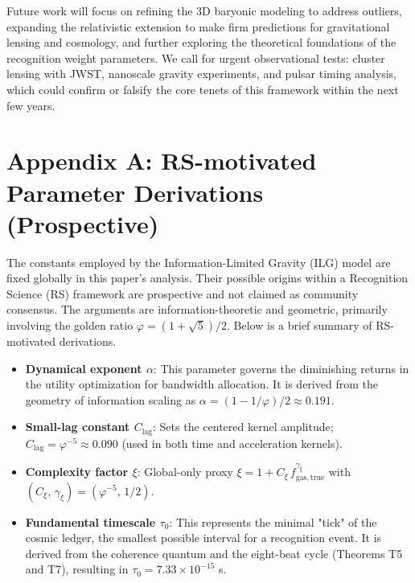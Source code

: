 \documentclass[12pt,a4paper]{article}
\begin{document}
Future work will focus on refining the 3D baryonic modeling to address outliers, expanding the relativistic extension to make firm predictions for gravitational lensing and cosmology, and further exploring the theoretical foundations of the recognition weight parameters. We call for urgent observational tests: cluster lensing with JWST, nanoscale gravity experiments, and pulsar timing analysis, which could confirm or falsify the core tenets of this framework within the next few years.

\appendix
\section*{Appendix A: RS-motivated Parameter Derivations (Prospective)}

The constants employed by the Information-Limited Gravity (ILG) model are fixed globally in this paper's analysis. Their possible origins within a Recognition Science (RS) framework are prospective and not claimed as community consensus. The arguments are information-theoretic and geometric, primarily involving the golden ratio $\varphi = (1+\sqrt{5})/2$. Below is a brief summary of RS-motivated derivations.

\begin{itemize}
    \item \textbf{Dynamical exponent $\alpha$}: This parameter governs the diminishing returns in the utility optimization for bandwidth allocation. It is derived from the geometry of information scaling as $\alpha = (1-1/\varphi)/2 \approx 0.191$.
    
    \item \textbf{Small-lag constant $C_\mathrm{lag}$}: Sets the centered kernel amplitude; $C_\mathrm{lag} = \varphi^{-5} \approx 0.090$ (used in both time and acceleration kernels).
    
    \item \textbf{Complexity factor $\xi$}: Global-only proxy $\xi = 1 + C_\xi\, f_\mathrm{gas,true}^{\gamma_\xi}$ with $(C_\xi,\,\gamma_\xi) = (\varphi^{-5},\,1/2)$.
    
    \item \textbf{Fundamental timescale $\tau_0$}: This represents the minimal "tick" of the cosmic ledger, the smallest possible interval for a recognition event. It is derived from the coherence quantum and the eight-beat cycle (Theorems T5 and T7), resulting in $\tau_0 = 7.33 \times 10^{-15}$ s.
\end{itemize}
\end{document}
